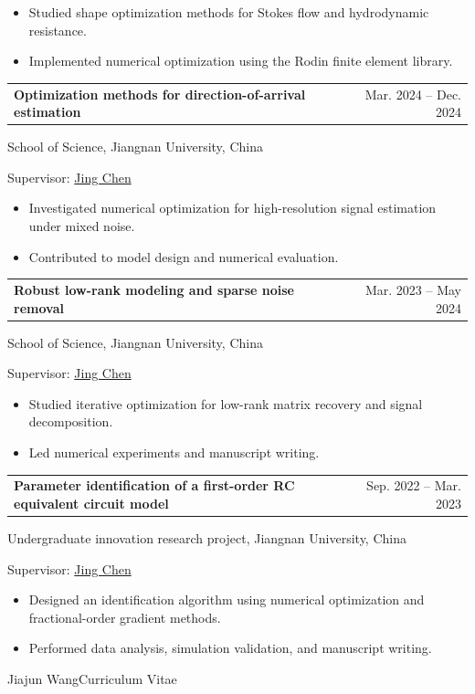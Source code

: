 \documentclass[10pt,a4paper]{article}
\makeatletter
\newcommand{\entry}[3]{\par\begin{tabularx}{\textwidth}{@{}Xr@{}}\textbf{#1}&{\small\color{muted}#2}\end{tabularx}\par{\small\color{muted}#3}\par}
\makeatother
\begin{document}
\begin{itemize}
\item Studied shape optimization methods for Stokes flow and hydrodynamic resistance.
\item Implemented numerical optimization using the Rodin finite element library.
\end{itemize}
\entry{Optimization methods for direction-of-arrival estimation}{Mar. 2024 -- Dec. 2024}{School of Science, Jiangnan University, China}
{\small\color{muted}Supervisor: \href{https://science.jiangnan.edu.cn/info/1017/7624.htm}{Jing Chen}}\par

\begin{itemize}
\item Investigated numerical optimization for high-resolution signal estimation under mixed noise.
\item Contributed to model design and numerical evaluation.
\end{itemize}
\entry{Robust low-rank modeling and sparse noise removal}{Mar. 2023 -- May 2024}{School of Science, Jiangnan University, China}
{\small\color{muted}Supervisor: \href{https://science.jiangnan.edu.cn/info/1017/7624.htm}{Jing Chen}}\par

\begin{itemize}
\item Studied iterative optimization for low-rank matrix recovery and signal decomposition.
\item Led numerical experiments and manuscript writing.
\end{itemize}
\entry{Parameter identification of a first-order RC equivalent circuit model}{Sep. 2022 -- Mar. 2023}{Undergraduate innovation research project, Jiangnan University, China}
{\small\color{muted}Supervisor: \href{https://science.jiangnan.edu.cn/info/1017/7624.htm}{Jing Chen}}\par

\begin{itemize}
\item Designed an identification algorithm using numerical optimization and fractional-order gradient methods.
\item Performed data analysis, simulation validation, and manuscript writing.
\end{itemize}

\newpage
{\large Jiajun Wang}\hfill{\small\color{muted}Curriculum Vitae}\par
\end{document}

